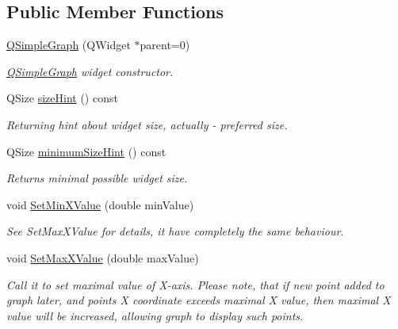 \subsection*{Public Member Functions}
\begin{DoxyCompactItemize}
\item 
\hyperlink{class_fossa_1_1_q_simple_graph_1_1_q_simple_graph_ab08b1293b3698e1e179a8d36dc737c77}{Q\+Simple\+Graph} (Q\+Widget $\ast$parent=0)
\begin{DoxyCompactList}\small\item\em \hyperlink{class_fossa_1_1_q_simple_graph_1_1_q_simple_graph}{Q\+Simple\+Graph} widget constructor. \end{DoxyCompactList}\item 
Q\+Size \hyperlink{class_fossa_1_1_q_simple_graph_1_1_q_simple_graph_a7cc7465f2137a1d9f80425afec47faeb}{size\+Hint} () const
\begin{DoxyCompactList}\small\item\em Returning hint about widget size, actually -\/ preferred size. \end{DoxyCompactList}\item 
Q\+Size \hyperlink{class_fossa_1_1_q_simple_graph_1_1_q_simple_graph_a2b427ee7fc54efd87a33d0a23bbdd1f8}{minimum\+Size\+Hint} () const
\begin{DoxyCompactList}\small\item\em Returns minimal possible widget size. \end{DoxyCompactList}\item 
void \hyperlink{class_fossa_1_1_q_simple_graph_1_1_q_simple_graph_a0eef21e58d8c85f6083d73857f871639}{Set\+Min\+X\+Value} (double min\+Value)
\begin{DoxyCompactList}\small\item\em See Set\+Max\+X\+Value for details, it have completely the same behaviour. \end{DoxyCompactList}\item 
void \hyperlink{class_fossa_1_1_q_simple_graph_1_1_q_simple_graph_a568a2dea4e0307b6888aaa048b4da97a}{Set\+Max\+X\+Value} (double max\+Value)
\begin{DoxyCompactList}\small\item\em Call it to set maximal value of X-\/axis. Please note, that if new point added to graph later, and point\textquotesingle{}s X coordinate exceeds maximal X value, then maximal X value will be increased, allowing graph to display such points. \end{DoxyCompactList}\item 

\end{DoxyCompactItemize}
